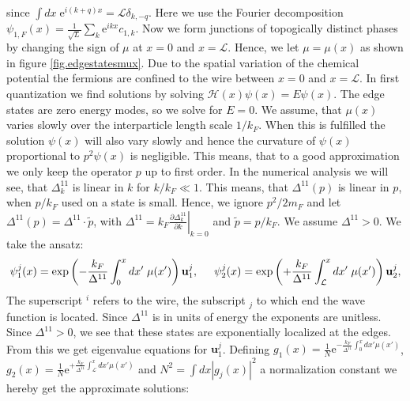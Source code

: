 since $\int dx\; \text{e}^{i(k + q)x} =\mathcal{L} \delta_{k,-q} $. Here we use the Fourier decomposition $\psi_{1,F}(x) = \frac{1}{\sqrt{L}}\sum_k\text{e}^{ikx}c_{1,k}$. Now we form junctions of topogically distinct phases by changing the sign of $\mu$ at $x = 0$ and $x = \mathcal{L}$. Hence, we let $\mu = \mu(x)$ as shown in figure \ref{fig.edgestatesmux}. Due to the spatial variation of the chemical potential the fermions are confined to the wire between $x = 0$ and $x = \mathcal{L}$. In first quantization we find solutions by solving $\mathcal{H}(x)\psi(x) = E\psi(x)$. The edge states are zero energy modes, so we solve for $E = 0$. We assume, that $\mu(x)$ varies slowly over the interparticle length scale $1/k_F$. When this is fulfilled the solution $\psi(x)$ will also vary slowly and hence the curvature of $\psi(x)$ proportional to $p^2\psi(x)$ is negligible. This means, that to a good approximation we only keep the operator $p$ up to first order. In the numerical analysis we will see, that $\Delta^{11}_k$ is linear in $k$ for $k/k_F \ll 1$. This means, that $\Delta^{11}(p)$ is linear in $p$, when $p/k_F$ used on a state is small. Hence, we ignore $p^2/2m_F$ and let $\Delta^{11}(p) = \Delta^{11} \cdot \tilde{p}$, with $\Delta^{11} = k_F\left.\frac{\partial \Delta^{11}_k}{\partial k}\right|_{k=0}$ and $\tilde{p} = p/k_F$. We assume $\Delta^{11} > 0$. We take the ansatz:
\begin{equation}
\psi^{j}_1(x) = \exp\left(-\frac{k_F}{\Delta^{11}}\int_{0}^{x} dx'\; \mu(x') \right)\mathbf{u}^{j}_{1}, \hspace{0.5cm} \psi^{j}_2(x) = \exp\left(+\frac{k_F}{\Delta^{11}}\int_{\mathcal{L}}^{x} dx'\; \mu(x') \right)\mathbf{u}^{j}_{2}, \nonumber
\end{equation}  
The superscript ${}^i$ refers to the wire, the subscript ${}_j$ to which end the wave function is located. Since $\Delta^{11}$ is in units of energy the exponents are unitless. Since $\Delta^{11} > 0$, we see that these states are exponentially localized at the edges. From this we get eigenvalue equations for $\mathbf{u}^{j}_{1}$. Defining $g_1(x) = \frac{1}{N}\text{e}^{-\frac{k_F}{\Delta^{11}}\int_{0}^{x} dx' \mu(x')}$, $g_2(x) = \frac{1}{N}\text{e}^{+\frac{k_F}{\Delta^{11}}\int_{\mathcal{L}}^{x} dx' \mu(x')}$ and $N^2 = \int dx |g_j(x)|^2$ a normalization constant we hereby get the approximate solutions:
